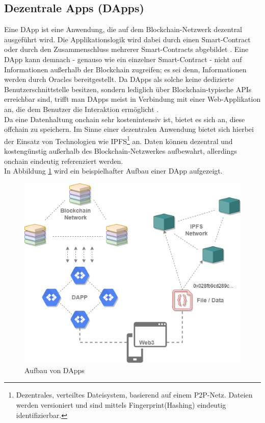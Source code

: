 \subsection{Dezentrale Apps (DApps)}
\label{subsec:fundamentals:dlt:dapps}
Eine \ac{DApp} ist eine Anwendung, die auf dem Blockchain-Netzwerk dezentral ausgeführt wird. Die Applikationslogik wird dabei durch einen Smart-Contract oder durch den Zusammenschluss mehrerer Smart-Contracts abgebildet \cite{dapps2018}. Eine \ac{DApp} kann demnach - genauso wie ein einzelner Smart-Contract - nicht auf Informationen außerhalb der Blockchain zugreifen; es sei denn, Informationen werden durch Oracles bereitgestellt. Da \acp{DApp} als solche keine dedizierte Benutzerschnittstelle besitzen, sondern lediglich über Blockchain-typische \acp{API} erreichbar sind, trifft man \acp{DApp} meist in Verbindung mit einer Web-Applikation an, die dem Benutzer die Interaktion ermöglicht \cite{DAPPS2016}.\\
Da eine Datenhaltung onchain sehr kostenintensiv ist, bietet es sich an, diese offchain zu speichern. Im Sinne einer dezentralen Anwendung bietet sich hierbei der Einsatz von Technologien wie \ac{IPFS}\footnote{Dezentrales, verteiltes Dateisystem, basierend auf einem \ac{P2P}-Netz. Dateien werden versioniert und sind mittels Fingerprint(Hashing) eindeutig identifizierbar.} an. Daten können dezentral und kostengünstig außerhalb des Blockchain-Netzwerkes aufbewahrt, allerdings onchain eindeutig referenziert werden.\\
In Abbildung \ref{fig:chapter02:overview-dapp} wird ein beispielhafter Aufbau einer \ac{DApp} aufgezeigt.

\begin{figure}[h]
 \centering
 \includegraphics[width=1.0\textwidth]{gfx/Overview-DAPP.png}
 \caption{Aufbau von DApps}
 \label{fig:chapter02:overview-dapp}
\end{figure}

